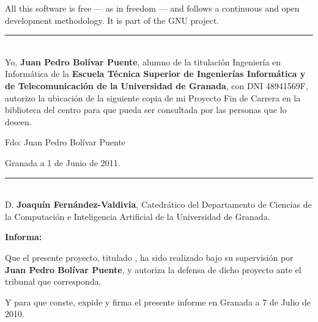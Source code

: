 All this software is free --- as in freedom --- and follows a
continuous and open development methodology. It is part of the GNU
project.


\cleardoublepage
\thispagestyle{empty}
\noindent\rule[-1ex]{\textwidth}{2pt}\\[4.5ex]

Yo, \textbf{Juan Pedro Bolívar Puente}, alumno de la titulación
Ingeniería en Informática de la \textbf{Escuela Técnica Superior de
  Ingenierías Informática y de Telecomunicación de la Universidad de
  Granada}, con DNI 48941569F, autorizo la ubicación de la siguiente
copia de mi Proyecto Fin de Carrera en la biblioteca del centro para
que pueda ser consultada por las personas que lo deseen.

\vspace{6cm}
\noindent Fdo: Juan Pedro Bolívar Puente

\vspace{2cm}

\begin{flushright}
Granada a 1 de Junio de 2011.
\end{flushright}



\clearpage
\thispagestyle{empty}
\noindent\rule[-1ex]{\textwidth}{2pt}\\[4.5ex]

D. \textbf{Joaquín Fernández-Valdivia}, Catedrático del Departamento
de Ciencias de la Computación e Inteligencia Artificial de la
Universidad de Granada.  \vspace{0.5cm}

\textbf{Informa:}
\vspace{0.5cm}

Que el presente proyecto, titulado \textit{\textbf{\myTitle}}, ha sido
realizado bajo su supervisión por \textbf{Juan Pedro Bolívar Puente},
y autoriza la defensa de dicho proyecto ante el tribunal que
corresponda.  \vspace{0.5cm}

Y para que conste, expide y firma el presente informe en Granada a 7
de Julio de 2010.
\vspace{1cm}

